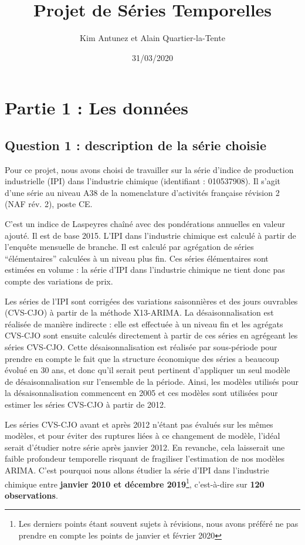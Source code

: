 \documentclass[]{article}
\title{Projet de Séries Temporelles}
\author{Kim Antunez et Alain Quartier-la-Tente}
\date{31/03/2020}
\begin{document}
\maketitle

{
\setcounter{tocdepth}{3}
\tableofcontents
}
\hypertarget{partie-1-les-donnuxe9es}{%
\section{Partie 1 : Les données}\label{partie-1-les-donnuxe9es}}

\hypertarget{question-1-description-de-la-suxe9rie-choisie}{%
\subsection{Question 1 : description de la série choisie}\label{question-1-description-de-la-suxe9rie-choisie}}

Pour ce projet, nous avons choisi de travailler sur la série d'indice de production industrielle (IPI) dans l'industrie chimique (identifiant : 010537908). Il s'agit d'une série au niveau A38 de la nomenclature d'activités française révision 2 (NAF rév. 2), poste CE.

C'est un indice de Laspeyres chaîné avec des pondérations annuelles en valeur ajouté. Il est de base 2015. L'IPI dans l'industrie chimique est calculé à partir de l'enquête mensuelle de branche. Il est calculé par agrégation de séries ``élémentaires'' calculées à un niveau plus fin. Ces séries élémentaires sont estimées en volume : la série d'IPI dans l'industrie chimique ne tient donc pas compte des variations de prix.

Les séries de l'IPI sont corrigées des variations saisonnières et des jours ouvrables (CVS-CJO) à partir de la méthode X13-ARIMA. La désaisonnalisation est réalisée de manière indirecte : elle est effectuée à un niveau fin et les agrégats CVS-CJO sont ensuite calculés directement à partir de ces séries en agrégeant les séries CVS-CJO. Cette désaisonnalisation est réalisée par sous-période pour prendre en compte le fait que la structure économique des séries a beaucoup évolué en 30 ans, et donc qu'il serait peut pertinent d'appliquer un seul modèle de désaisonnalisation sur l'ensemble de la période. Ainsi, les modèles utilisés pour la désaisonnalisation commencent en 2005 et ces modèles sont utilisées pour estimer les séries CVS-CJO à partir de 2012.

Les séries CVS-CJO avant et après 2012 n'étant pas évalués sur les mêmes modèles, et pour éviter des ruptures liées à ce changement de modèle, l'idéal serait d'étudier notre série après janvier 2012. En revanche, cela laisserait une faible profondeur temporelle risquant de fragiliser l'estimation de nos modèles ARIMA. C'est pourquoi nous allons étudier la série d'IPI dans l'industrie chimique entre \textbf{janvier 2010 et décembre 2019}\footnote{Les derniers points étant souvent sujets à révisions, nous avons préféré ne pas prendre en compte les points de janvier et février 2020}, c'est-à-dire sur \textbf{120 observations}.
\end{document}

